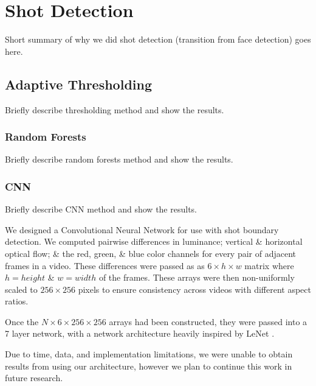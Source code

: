 \section*{Shot Detection}

Short summary of why we did shot detection (transition from face detection) goes here.

\subsection*{Adaptive Thresholding}

Briefly describe thresholding method and show the results.

\subsubsection*{Random Forests}

Briefly describe random forests method and show the results.

\subsubsection*{CNN}

Briefly describe CNN method and show the results.

We designed a Convolutional Neural Network for use with shot boundary detection. We computed pairwise differences in luminance; vertical \& horizontal optical flow; \& the red, green, \& blue color channels for every pair of adjacent frames in a video. These differences were passed as as $6 \times h \times w$ matrix where $h = height$ \& $w = width$ of the frames. These arrays were then non-uniformly scaled to $256 \times 256$ pixels to ensure consistency across videos with different aspect ratios. 

Once the $N \times 6 \times 256 \times 256$ arrays had been constructed, they were passed into a 7 layer network, with a network architecture heavily inspired by LeNet \cite{lecun1998gradient}.

Due to time, data, and implementation limitations, we were unable to obtain results from using our architecture, however we plan to continue this work in future research. 



